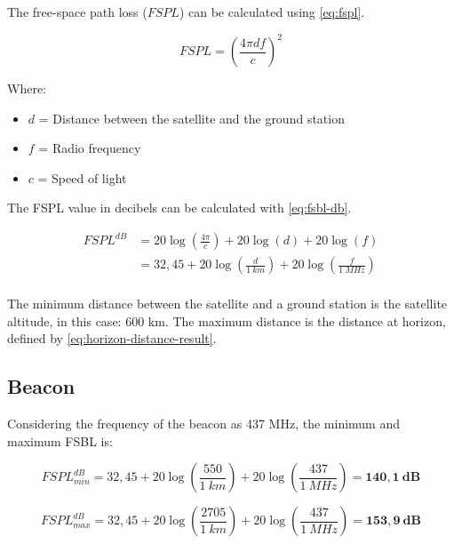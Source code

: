The free-space path loss ($FSPL$) can be calculated using \autoref{eq:fspl}.

\begin{equation} \label{eq:fspl}
FSPL = \left( \frac{4\pi d f}{c} \right)^{2}
\end{equation}

Where:

\begin{itemize}
    \item $d$ = Distance between the satellite and the ground station
    \item $f$ = Radio frequency
    \item $c$ = Speed of light
\end{itemize}

The FSPL value in decibels can be calculated with \autoref{eq:fsbl-db}.

\begin{equation} \label{eq:fsbl-db}
    \begin{split}
        FSPL^{dB} & = 20\log\left(\frac{4\pi}{c}\right) + 20\log\left(d\right) + 20\log\left(f\right) \\
                  & = 32,45 + 20\log\left(\frac{d}{1\ km}\right) + 20\log\left(\frac{f}{1\ MHz}\right) \\
    \end{split}
\end{equation}

The minimum distance between the satellite and a ground station is the satellite altitude, in this case: 600 km. The maximum distance is the distance at horizon, defined by \autoref{eq:horizon-distance-result}.

\subsection{Beacon}

Considering the frequency of the beacon as 437 MHz, the minimum and maximum FSBL is:

\begin{equation}
    FSPL^{dB}_{min} = 32,45 + 20\log\left(\frac{550}{1\ km}\right) + 20\log\left(\frac{437}{1\ MHz}\right) = \mathbf{140,1\ dB}
\end{equation}

\begin{equation}
    FSPL^{dB}_{max} = 32,45 + 20\log\left(\frac{2705}{1\ km}\right) + 20\log\left(\frac{437}{1\ MHz}\right) = \mathbf{153,9\ dB}
\end{equation}

